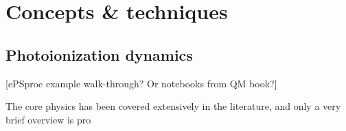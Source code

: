 \section{Concepts \& techniques}

\subsection{Photoionization dynamics} 
[ePSproc example walk-through? Or notebooks from QM book?]

The core physics has been covered extensively in the literature, and only a very brief overview is pro
